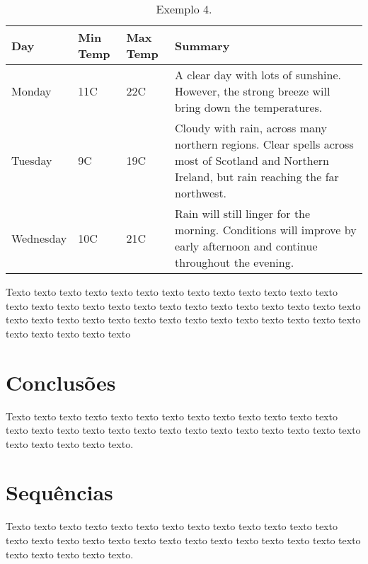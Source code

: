 \documentclass[tcc2]{uftex}
\begin{document}
\begin{table}[!h]
\caption{Exemplo 4.}\label{tab:4}
\begin{center}
    \begin{tabular}{ | l | l | l | p{5cm} |}
    \hline
    Day & Min Temp & Max Temp & Summary \\ \hline
    Monday & 11C & 22C & A clear day with lots of sunshine.  
    However, the strong breeze will bring down the temperatures. \\ \hline
    Tuesday & 9C & 19C & Cloudy with rain, across many northern regions. Clear spells 
    across most of Scotland and Northern Ireland, 
    but rain reaching the far northwest. \\ \hline
    Wednesday & 10C & 21C & Rain will still linger for the morning. 
    Conditions will improve by early afternoon and continue 
    throughout the evening. \\
    \hline
    \end{tabular}
\end{center}
\end{table}

Texto texto texto texto texto texto texto texto texto texto texto texto texto
texto texto texto texto texto texto texto texto texto texto texto texto texto
texto texto texto texto texto texto texto texto texto texto texto texto texto
texto texto texto texto texto texto texto
\chapter{Conclusões}
\label{cap:conclusoes}

\noindent Texto texto texto texto texto texto texto texto texto texto texto texto texto
texto texto texto texto texto texto texto texto texto texto texto texto texto
texto texto texto texto texto texto.


\backmatter 
\singlespacing   


\appendix
\onehalfspacing

\chapter{Sequências}
\label{ape:sequencias}

\noindent Texto texto texto texto texto texto texto texto texto texto texto texto texto
texto texto texto texto texto texto texto texto texto texto texto texto texto
texto texto texto texto texto texto.
\end{document}
